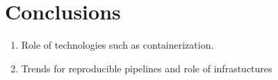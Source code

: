% 
% 

\chapter{Conclusions}
\label{cha:conclusion}


\begin{enumerate}
   \item Role of technologies such as containerization. 
   \item Trends for reproducible pipelines and role of infrastuctures
\end{enumerate}










